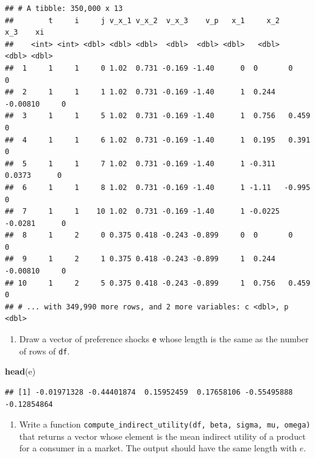 \documentclass[]{book}
\newenvironment{Shaded}{\begin{snugshade}}{\end{snugshade}}
\newcommand{\KeywordTok}[1]{\textcolor[rgb]{0.13,0.29,0.53}{\textbf{#1}}}
\newcommand{\NormalTok}[1]{#1}
\providecommand{\tightlist}{%
  \setlength{\itemsep}{0pt}\setlength{\parskip}{0pt}}
\begin{document}
\begin{verbatim}
## # A tibble: 350,000 x 13
##        t     i     j v_x_1 v_x_2  v_x_3    v_p   x_1     x_2      x_3    xi
##    <int> <int> <dbl> <dbl> <dbl>  <dbl>  <dbl> <dbl>   <dbl>    <dbl> <dbl>
##  1     1     1     0 1.02  0.731 -0.169 -1.40      0  0       0           0
##  2     1     1     1 1.02  0.731 -0.169 -1.40      1  0.244  -0.00810     0
##  3     1     1     5 1.02  0.731 -0.169 -1.40      1  0.756   0.459       0
##  4     1     1     6 1.02  0.731 -0.169 -1.40      1  0.195   0.391       0
##  5     1     1     7 1.02  0.731 -0.169 -1.40      1 -0.311   0.0373      0
##  6     1     1     8 1.02  0.731 -0.169 -1.40      1 -1.11   -0.995       0
##  7     1     1    10 1.02  0.731 -0.169 -1.40      1 -0.0225 -0.0281      0
##  8     1     2     0 0.375 0.418 -0.243 -0.899     0  0       0           0
##  9     1     2     1 0.375 0.418 -0.243 -0.899     1  0.244  -0.00810     0
## 10     1     2     5 0.375 0.418 -0.243 -0.899     1  0.756   0.459       0
## # ... with 349,990 more rows, and 2 more variables: c <dbl>, p <dbl>
\end{verbatim}

\begin{enumerate}
\def\labelenumi{\arabic{enumi}.}
\setcounter{enumi}{5}
\tightlist
\item
  Draw a vector of preference shocks \texttt{e} whose length is the same
  as the number of rows of \texttt{df}.
\end{enumerate}

\begin{Shaded}
\begin{Highlighting}[]
\KeywordTok{head}\NormalTok{(e)}
\end{Highlighting}
\end{Shaded}

\begin{verbatim}
## [1] -0.01971328 -0.44401874  0.15952459  0.17658106 -0.55495888 -0.12854864
\end{verbatim}

\begin{enumerate}
\def\labelenumi{\arabic{enumi}.}
\setcounter{enumi}{6}
\tightlist
\item
  Write a function
  \texttt{compute\_indirect\_utility(df,\ beta,\ sigma,\ mu,\ omega)}
  that returns a vector whose element is the mean indirect utility of a
  product for a consumer in a market. The output should have the same
  length with \(e\).
\end{enumerate}
\end{document}
